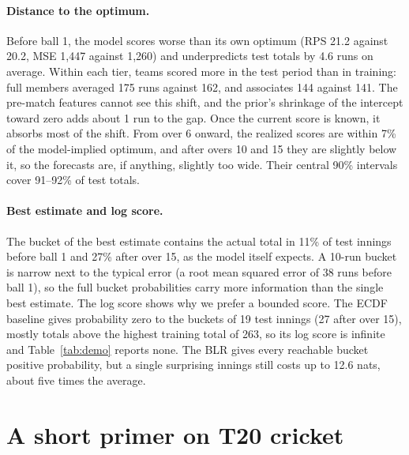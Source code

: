 \documentclass{article}
\newcommand{\1}{\mathbf{1}}
\begin{document}
\paragraph{Distance to the optimum.} Before ball 1, the model scores worse than its own optimum (RPS 21.2 against 20.2, MSE 1{,}447 against 1{,}260) and underpredicts test totals by 4.6 runs on average. Within each tier, teams scored more in the test period than in training: full members averaged 175 runs against 162, and associates 144 against 141. The pre-match features cannot see this shift, and the prior's shrinkage of the intercept toward zero adds about 1 run to the gap. Once the current score is known, it absorbs most of the shift. From over 6 onward, the realized scores are within 7\% of the model-implied optimum, and after overs 10 and 15 they are slightly below it, so the forecasts are, if anything, slightly too wide. Their central 90\% intervals cover 91--92\% of test totals.

\paragraph{Best estimate and log score.} The bucket of the best estimate contains the actual total in 11\% of test innings before ball 1 and 27\% after over 15, as the model itself expects. A 10-run bucket is narrow next to the typical error (a root mean squared error of 38 runs before ball 1), so the full bucket probabilities carry more information than the single best estimate. The log score shows why we prefer a bounded score. The ECDF baseline gives probability zero to the buckets of 19 test innings (27 after over 15), mostly totals above the highest training total of 263, so its log score is infinite and Table~\ref{tab:demo} reports none. The BLR gives every reachable bucket positive probability, but a single surprising innings still costs up to 12.6 nats, about five times the average.








\appendix
\section{A short primer on T20 cricket}\label{app:primer}
\end{document}
